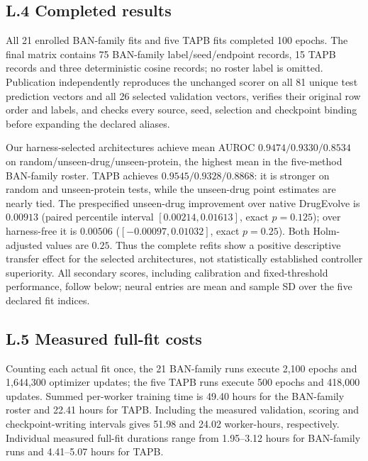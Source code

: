 \subsection*{L.4 Completed results}
All 21 enrolled BAN-family fits and five TAPB fits completed 100 epochs. The final matrix contains 75 BAN-family label/seed/endpoint records, 15 TAPB records and three deterministic cosine records; no roster label is omitted. Publication independently reproduces the unchanged scorer on all 81 unique test prediction vectors and all 26 selected validation vectors, verifies their original row order and labels, and checks every source, seed, selection and checkpoint binding before expanding the declared aliases.

Our harness-selected architectures achieve mean AUROC $0.9474/0.9330/0.8534$ on random/unseen-drug/unseen-protein, the highest mean in the five-method BAN-family roster. TAPB achieves $0.9545/0.9328/0.8868$: it is stronger on random and unseen-protein tests, while the unseen-drug point estimates are nearly tied. The prespecified unseen-drug improvement over native DrugEvolve is $0.00913$ (paired percentile interval $[0.00214,0.01613]$, exact $p=0.125$); over harness-free it is $0.00506$ ($[-0.00097,0.01032]$, exact $p=0.25$). Both Holm-adjusted values are $0.25$. Thus the complete refits show a positive descriptive transfer effect for the selected architectures, not statistically established controller superiority. All secondary scores, including calibration and fixed-threshold performance, follow below; neural entries are mean and sample SD over the five declared fit indices.

\begingroup
\footnotesize
\setlength{\tabcolsep}{3pt}
\renewcommand{\paragraph}[1]{\par\medskip\noindent\textbf{#1}\par\nobreak\smallskip\noindent}

\endgroup

\subsection*{L.5 Measured full-fit costs}
Counting each actual fit once, the 21 BAN-family runs execute 2,100 epochs and 1,644,300 optimizer updates; the five TAPB runs execute 500 epochs and 418,000 updates. Summed per-worker training time is 49.40 hours for the BAN-family roster and 22.41 hours for TAPB. Including the measured validation, scoring and checkpoint-writing intervals gives 51.98 and 24.02 worker-hours, respectively. Individual measured full-fit durations range from 1.95--3.12 hours for BAN-family runs and 4.41--5.07 hours for TAPB.

